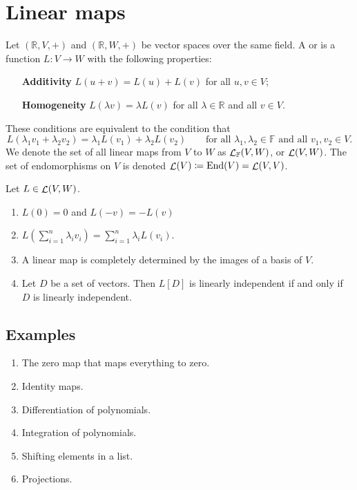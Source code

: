 \section{Linear maps}
\begin{definition}
Let $(\mathbb{R}, V, +)$ and $(\mathbb{R}, W, +)$ be vector spaces over the same field. A  or  is a function $L:V\to W$ with the following properties:
\begin{itemize}[leftmargin=3cm]
\item[\textbf{Additivity}] $L(u+v) = L(u)+L(v)$ for all $u,v \in V$;
\item[\textbf{Homogeneity}] $L(\lambda v) = \lambda L(v)$ for all $\lambda \in \mathbb{R}$ and all $v\in V$.
\end{itemize}
These conditions are equivalent to the condition that
\[ L(\lambda_1 v_1 + \lambda_2v_2) = \lambda_1L(v_1) + \lambda_2 L(v_2) \qquad \text{for all $\lambda_1,\lambda_2\in \mathbb{F}$ and all $v_1,v_2\in V$.} \]
We denote the set of all linear maps from $V$ to $W$ as $\mathop{\mathcal{L}}_\mathbb{F}(V,W)$, or $\mathop{\mathcal{L}}(V,W)$. The set of endomorphisms on $V$ is denoted $\mathop{\mathcal{L}}(V) \coloneqq \operatorname{End}(V) = \mathop{\mathcal{L}}(V,V)$.
\end{definition}

\begin{lemma} \label{lemma:linearMaps}
Let $L\in \mathop{\mathcal{L}}(V,W)$.
\begin{enumerate}
\item $L(0) = 0$ and $L(-v) = -L(v)$
\item $L\left(\sum^n_{i=1}\lambda_i v_i\right) = \sum_{i=1}^n\lambda_i L(v_i)$.
\item A linear map is completely determined by the images of a basis of $V$.
\item Let $D$ be a set of vectors. Then $L[D]$ is linearly independent \textup{if and only if} $D$ is linearly independent.
\end{enumerate} \label{lemma:linearMaps}
\end{lemma}

\subsection{Examples}
\begin{enumerate}
\item The zero map that maps everything to zero.
\item Identity maps.
\item Differentiation of polynomials.
\item Integration of polynomials.
\item Shifting elements in a list.
\item Projections.
\end{enumerate}

